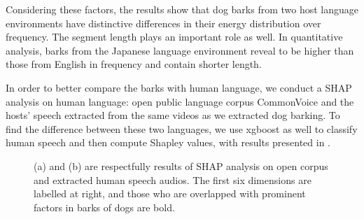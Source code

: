 Considering these factors, the results show that dog barks from two host language environments have distinctive differences in their energy distribution over frequency. The segment length plays an important role as well. In quantitative analysis, barks from the Japanese language environment reveal to be higher than those from English in frequency and contain shorter length.

In order to better compare the barks with human language, we conduct a SHAP analysis on human language: open public language corpus CommonVoice and the hosts' speech extracted from the same videos as we extracted dog barking. 
To find the difference between these two languages, we use xgboost as well to classify human speech and then compute Shapley values, with results presented in .


\begin{figure}[th]
	\centering
	\caption{(a) and (b) are respectfully results of SHAP analysis on open corpus and extracted human speech audios. The first six dimensions are labelled at right, and those who are overlapped with prominent factors in barks of dogs are bold.}
	\label{fig:humanspeech}
\end{figure}

